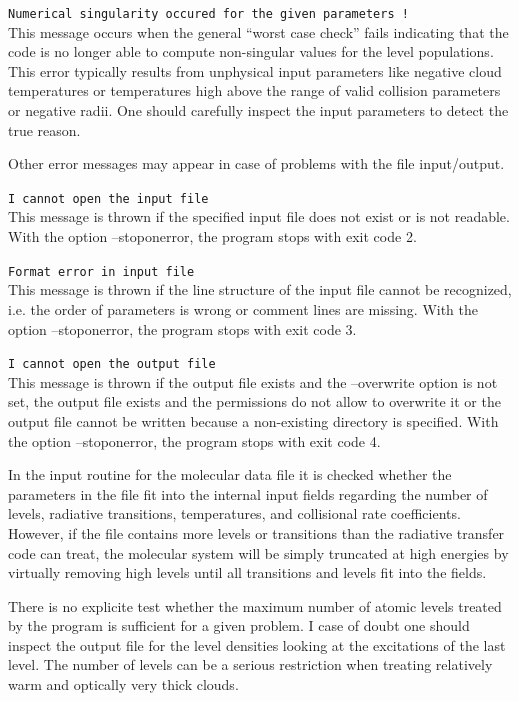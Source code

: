 \begin{description}
\item{}{\tt Numerical singularity occured for the given parameters !}\\
This message occurs when the general ``worst case check'' fails indicating
that the code is no longer able to compute non-singular values for
the level populations. This error typically results from unphysical
input parameters like negative cloud temperatures or temperatures
high above the range of valid collision parameters or negative radii.
One should carefully inspect the input parameters to detect the 
true reason.
\end{description}

Other error messages may appear in case of problems with the file
input/output.
\begin{description}
\item{}{\tt  I cannot open the input file}\\
This message is thrown if the specified input file does not exist or is
not readable. With the option --stoponerror, the program stops with
exit code 2.
\item{}{\tt Format error in input file}\\
This message is thrown if the line structure of the input file
cannot be recognized, i.e. the order of parameters is wrong or
comment lines are missing. With the option --stoponerror, the program stops with
exit code 3.
\item{}{\tt I cannot open the output file}\\
This message is thrown if the output file exists and the
--overwrite option is not set, the output file exists and
the permissions do not allow to overwrite it or the output
file cannot be written because a non-existing directory is specified.
With the option --stoponerror, the program stops with
exit code 4.
\end{description}

In the input routine for the molecular data file it is checked whether
the parameters in the file fit into the internal input fields
regarding the number of levels, radiative transitions, temperatures,
and collisional rate coefficients. However, if the file contains
more levels or transitions than the radiative transfer code can treat, 
the molecular system will
be simply truncated at high energies by virtually removing high
levels until all transitions and levels fit into the fields.

There is no explicite test whether the maximum number of atomic 
levels treated by the program is sufficient for a given problem.
I case of doubt one should inspect the output file for the level
densities looking at the excitations of the last level. The number of 
levels can be a serious restriction when treating relatively warm
and optically very thick clouds.


